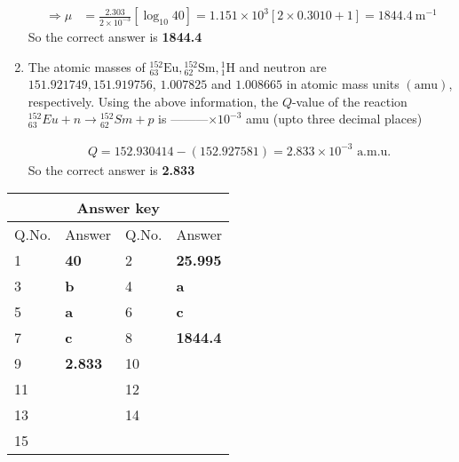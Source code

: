 \begin{enumerate}
\begin{answer}
\begin{align*}
		\Rightarrow \mu&=\frac{2.303}{2 \times 10^{-3}}\left[\log _{10} 40\right]=1.151 \times 10^3[2 \times 0.3010+1]=1844.4 \mathrm{~m}^{-1}
		\end{align*}
		So the correct answer is \textbf{1844.4}
	\end{answer}
	\item The atomic masses of ${ }_{63}^{152} \mathrm{Eu},{ }_{62}^{152} \mathrm{Sm},{ }_1^1 \mathrm{H}$ and neutron are $151.921749,151.919756$, $1.007825$ and $1.008665$ in atomic mass units $(\mathrm{amu})$, respectively. Using the above information, the $Q$-value of the reaction ${ }_{63}^{152} E u+n \rightarrow{ }_{62}^{152} S m+p$ is ---------$\times 10^{-3}$ amu (upto three decimal places)
	{}
	\begin{answer}
		\begin{align*}
		Q=152.930414-(152.927581)=2.833 \times 10^{-3} \text { a.m.u. }
		\end{align*}
		So the correct answer is \textbf{2.833}
	\end{answer}
\end{enumerate}
\setlength\arrayrulewidth{1pt}
\begin{table}[H]
	\centering
	\begin{tabular}{|p{1.5cm}|p{1.5cm}||p{1.5cm}|p{1.5cm}|}
		\hline
		\multicolumn{4}{|c|}{\textbf{Answer key}}\\\hline\hline
		\rowcolor{ocrel}Q.No.&Answer&Q.No.&Answer\\\hline
		1&\textbf{40} &2&\textbf{25.995}\\\hline 
		3&\textbf{b} &4&\textbf{a} \\\hline
		5&\textbf{a} &6&\textbf{c} \\\hline
		7&\textbf{c}&8&\textbf{1844.4}\\\hline
		9&\textbf{2.833}&10&\textbf{}\\\hline
		11&\textbf{} &12&\textbf{}\\\hline
		13&\textbf{}&14&\textbf{}\\\hline
		15&\textbf{}& &\\\hline
		
	\end{tabular}
\end{table}